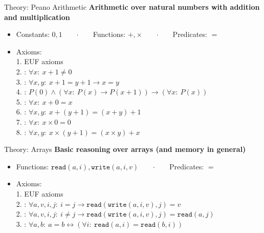 \documentclass[t,english]{sdqbeamer}
\begin{document}
\begin{frame}{Theory: Peano Arithmetic}
	\textbf{Arithmetic over natural numbers with addition and multiplication}
	\begin{itemize}
		\item Constants: $0, 1$\ \ \ \ $\cdot$\ \ \ \ Functions: $+, \times$\ \ \ \ $\cdot$\ \ \ \ Predicates: $=$
		\item Axioms:\\
		1. EUF axioms\\
		2. : $\forall x:\ x+1 \neq 0$\\
		3. : $\forall x, y:\ x+1 = y+1 \rightarrow x = y$\\
		4. : $P(0) \wedge (\forall x:\ P(x) \rightarrow P(x+1)) \rightarrow (\forall x:\ P(x))$\\
		5. : $\forall x:\ x+0=x$\\
		6. : $\forall x, y:\ x+(y+1) = (x+y)+1$\\
		7. : $\forall x:\ x \times 0 = 0$\\
		8. : $\forall x,y:\ x \times (y+1) = (x \times y) + x$\\
	\end{itemize}
\end{frame}

\newcommand{\funcread}{\texttt{read}}
\newcommand{\funcwrite}{\texttt{write}}

\begin{frame}{Theory: Arrays}
	\textbf{Basic reasoning over arrays (and memory in general)}
	\begin{itemize}
		\item Functions: $\funcread(a, i), \funcwrite(a, i, v)$\ \ \ \ $\cdot$\ \ \ \ Predicates: $=$
		\item Axioms:\\
		1. EUF axioms\\
		2. : $\forall a,v,i,j:\ i=j \rightarrow \funcread(\funcwrite(a,i,v),j)=v$\\
		2. : $\forall a,v,i,j:\ i\neq j \rightarrow \funcread(\funcwrite(a,i,v),j)=\funcread(a,j)$\\
		3. : $\forall a,b:\ a=b \leftrightarrow (\forall i:\ \funcread(a,i) = \funcread(b,i))$\\
	\end{itemize}
\end{frame}
\end{document}
